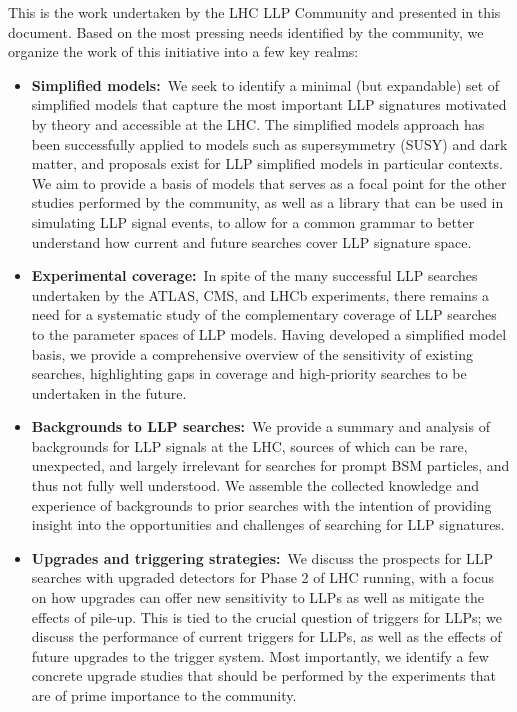 This is the work undertaken by the LHC LLP Community and presented in this document.
Based on the most pressing needs identified by the community, we organize the work of this initiative into a few key realms:
%
\begin{itemize}

\item {\bf Simplified models:}~We seek to identify a minimal (but expandable) set of simplified models that capture the most important LLP signatures motivated by theory and accessible at the LHC.
The simplified models approach has been successfully applied to models such as supersymmetry (SUSY) and dark matter, and proposals exist for LLP simplified models in particular contexts.
We aim to provide a basis of models that serves as a focal point for the other studies performed by the community, as well as a library that can be used in simulating LLP signal events, to allow for a common grammar to better understand how current and future searches cover LLP signature space.

\item {\bf Experimental coverage:}~In spite of the many successful LLP searches undertaken by the ATLAS, CMS, and LHCb experiments, there remains a need for a systematic study of the complementary coverage of LLP searches to the parameter spaces of LLP models.
Having developed a simplified model basis, we provide a comprehensive overview of the sensitivity of existing searches, highlighting gaps in coverage and high-priority searches to be undertaken in the future.

\item {\bf Backgrounds to LLP searches:}~We provide a summary and analysis of backgrounds for LLP signals at the LHC, sources of which can be rare, unexpected, and largely irrelevant for searches for prompt BSM particles, and thus not fully well understood.
We assemble the collected knowledge and experience of backgrounds to prior searches with the intention of providing insight into the opportunities and challenges of searching for LLP signatures.

\item {\bf Upgrades and triggering strategies:}~We discuss the prospects for LLP searches with upgraded detectors for Phase 2 of LHC running, with a focus on how upgrades can offer new sensitivity to LLPs as well as mitigate the effects of pile-up.
This is tied to the crucial question of triggers for LLPs; we discuss the performance of current triggers for LLPs, as well as the effects of future upgrades to the trigger system.
Most importantly, we identify a few concrete upgrade studies that should be performed by the experiments that are of prime importance to the community.


\end{itemize}
